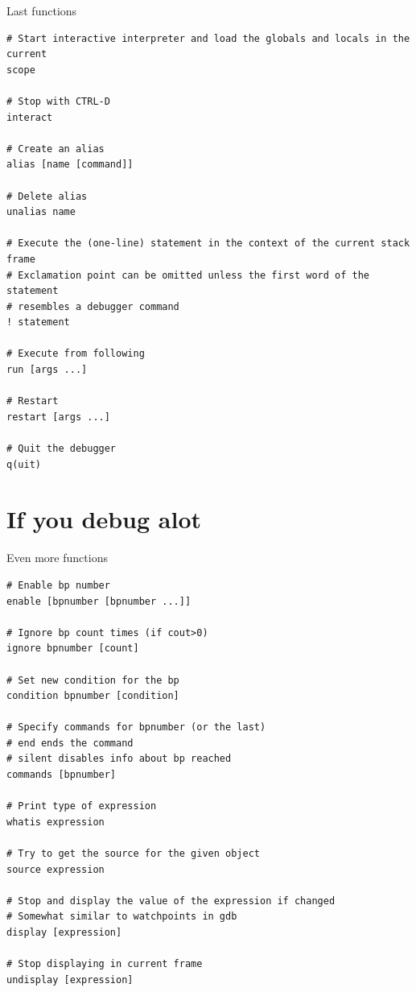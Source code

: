 \documentclass[
    size=20pt,
    style=sailor,
    display=slides,
    paper=smartboard,
    orient=landscape,
]{powerdot}
\begin{document}
\begin{slide}[method=file]{Last functions}
\begin{verbatim}
# Start interactive interpreter and load the globals and locals in the current 
scope

# Stop with CTRL-D
interact

# Create an alias
alias [name [command]]

# Delete alias
unalias name

# Execute the (one-line) statement in the context of the current stack frame
# Exclamation point can be omitted unless the first word of the statement 
# resembles a debugger command
! statement

# Execute from following
run [args ...]

# Restart
restart [args ...]

# Quit the debugger
q(uit)
\end{verbatim}
\end{slide}

\section{If you debug alot}


\begin{slide}[method=file]{Even more functions}
\begin{verbatim}
# Enable bp number
enable [bpnumber [bpnumber ...]]

# Ignore bp count times (if cout>0)
ignore bpnumber [count]

# Set new condition for the bp
condition bpnumber [condition]

# Specify commands for bpnumber (or the last)
# end ends the command
# silent disables info about bp reached
commands [bpnumber]

# Print type of expression
whatis expression

# Try to get the source for the given object
source expression

# Stop and display the value of the expression if changed
# Somewhat similar to watchpoints in gdb
display [expression]

# Stop displaying in current frame
undisplay [expression]
\end{verbatim}
\end{slide}
\end{document}
